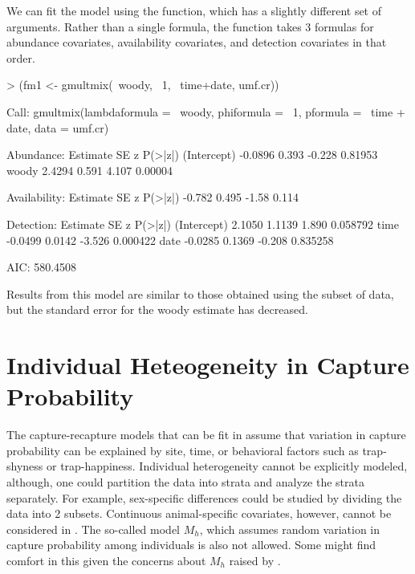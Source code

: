 \documentclass[a4paper]{article}
\renewenvironment{Schunk}{\vspace{\topsep}}{\vspace{\topsep}}
\begin{document}
We can fit the model using the  function, which has a
slightly different set of arguments. Rather than a single formula, the
function takes 3 formulas for abundance covariates, availability
covariates, and detection covariates in that order.


\begin{Schunk}
\begin{Sinput}
> (fm1 <- gmultmix(~woody, ~1, ~time+date, umf.cr))
\end{Sinput}
\begin{Soutput}
Call:
gmultmix(lambdaformula = ~woody, phiformula = ~1, pformula = ~time + 
    date, data = umf.cr)

Abundance:
            Estimate    SE      z P(>|z|)
(Intercept)  -0.0896 0.393 -0.228 0.81953
woody         2.4294 0.591  4.107 0.00004

Availability:
 Estimate    SE     z P(>|z|)
   -0.782 0.495 -1.58   0.114

Detection:
            Estimate     SE      z  P(>|z|)
(Intercept)   2.1050 1.1139  1.890 0.058792
time         -0.0499 0.0142 -3.526 0.000422
date         -0.0285 0.1369 -0.208 0.835258

AIC: 580.4508 
\end{Soutput}
\end{Schunk}

Results from this model are similar to those obtained using the subset
of data, but the standard error for the woody estimate has decreased.


\section*{Individual Heteogeneity in Capture Probability}

The capture-recapture models that can be fit in  assume
that variation in capture probability can be
explained by site, time, or behavioral factors such as trap-shyness or
trap-happiness. Individual
heterogeneity cannot be explicitly modeled, although, one could
partition the data into strata and analyze the strata separately. For
example, sex-specific
differences could be studied by dividing the data into 2 subsets.
Continuous animal-specific covariates, however, cannot be
considered in . The so-called model $M_h$, which assumes
random variation in capture probability among individuals is also not
allowed. Some might find comfort in this given the concerns about
$M_h$ raised by \citet{link:2003}.
\end{document}
